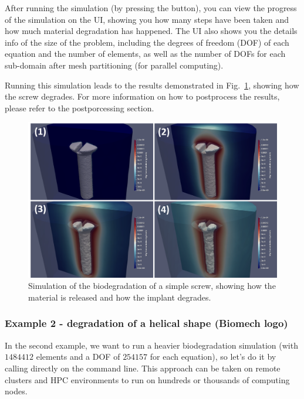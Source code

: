 After running the simulation (by pressing the  button), you can view the progress of the simulation on the UI, showing you how many steps have been taken and how much material degradation has happened. The UI also shows you the details info of the size of the problem, including the degrees of freedom (DOF) of each equation and the number of elements, as well as the number of DOFs for each sub-domain after mesh partitioning (for parallel computing). %

Running this simulation leads to the results demonstrated in Fig.~\ref{fig:screw_degradation}, showing how the screw degrades. For more information on how to postprocess the results, please refer to the postporcessing section.

\begin{figure}[h]
\center \includegraphics[width=15cm]{screw_degradation}
\caption{Simulation of the biodegradation of a simple screw, showing how the material is released and how the implant degrades.} \label{fig:screw_degradation}
\end{figure}


\subsubsection{Example 2 - degradation of a helical shape (Biomech logo)}\label{sec:example2}

In the second example, we want to run a heavier biodegradation simulation (with $\num{1484412}$ elements and a DOF of $\num{254157}$ for each equation), so let's do it by calling \biodeg{} directly on the command line. This approach can be taken on remote clusters and HPC environments to run \biodeg{} on hundreds or thousands of computing nodes. 

